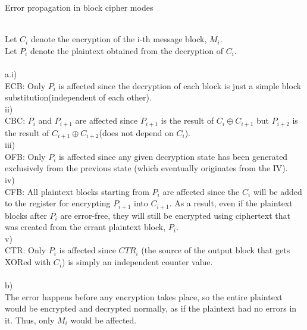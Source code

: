 \documentclass{assignment}
\begin{document}
\begin{problemlist}
\pbitem Error propagation in block cipher modes
\begin{problem}
\begin{answer}
\\
Let $C_i$ denote the encryption of the i-th message block, $M_i$.\\
Let $P_i$ denote the plaintext obtained from the decryption of $C_i$.\\
\\
a.i)\\
ECB: Only $P_i$ is affected since the decryption of each block is just a simple block substitution(independent of each other).\\
ii)\\CBC: $P_i$ and $P_{i+1}$ are affected since $P_{i+1}$ is the result of $C_i \oplus C_{i+1}$ but $P_{i+2}$ is the result of  $C_{i+1} \oplus C_{i+2}$(does not depend on $C_i$).\\
iii)\\
OFB: Only $P_i$ is affected since any given decryption state has been generated exclusively from the previous state (which eventually originates from the IV).\\
iv)\\
CFB: All plaintext blocks starting from $P_i$ are affected since the $C_i$ will be added to the register for encrypting $P_{i+1}$ into $C_{i+1}$.  As a result, even if the plaintext blocks after $P_i$ are error-free, they will still be encrypted using ciphertext that was created from the errant plaintext block, $P_i$.\\
v)\\
CTR: Only $P_i$ is affected since $CTR_i$ (the source of the output block that gets XORed with $C_i$) is simply an independent counter value.\\
\\
b)\\
The error happens before any encryption takes place, so the entire plaintext would be encrypted and decrypted normally, as if the plaintext had no errors in it.  Thus, only $M_i$ would be affected.\\
\\
\end{answer}
\end{problem}

\end{problemlist}
\end{document}
